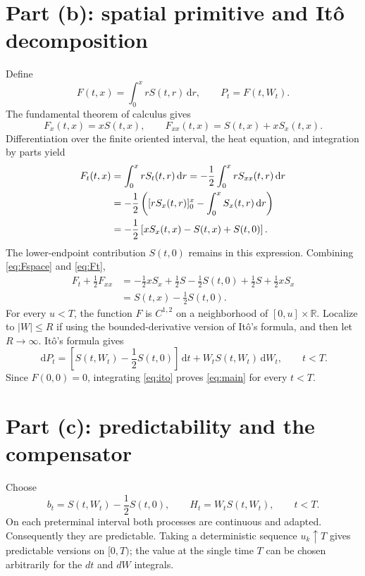 \documentclass[11pt,letterpaper]{article}
\newcommand{\R}{\mathbb R}
\newcommand{\dd}{\,\mathrm d}
\begin{document}
\section{Part (b): spatial primitive and It\^o decomposition}
Define
\begin{equation}
F(t,x)=\int_0^x rS(t,r)\dd r,\qquad P_t=F(t,W_t).
\end{equation}
The fundamental theorem of calculus gives
\begin{equation}\label{eq:Fspace}
F_x(t,x)=xS(t,x),\qquad F_{xx}(t,x)=S(t,x)+xS_x(t,x).
\end{equation}
Differentiation over the finite oriented interval, the heat equation, and integration by parts yield
\begin{align}
F_t(t,x)
&=\int_0^x rS_t(t,r)\dd r
=-\frac12\int_0^x rS_{xx}(t,r)\dd r\notag\\
&=-\frac12\left([rS_x(t,r)]_0^x-\int_0^xS_x(t,r)\dd r\right)\notag\\
&=-\frac12\left[xS_x(t,x)-S(t,x)+S(t,0)\right].\label{eq:Ft}
\end{align}
The lower-endpoint contribution $S(t,0)$ remains in this expression. Combining \eqref{eq:Fspace} and \eqref{eq:Ft},
\begin{equation}\label{eq:generator}
\begin{aligned}
F_t+\frac12F_{xx}
&=-\frac12xS_x+\frac12S-\frac12S(t,0)+\frac12S+\frac12xS_x\\
&=\boxed{S(t,x)-\frac12S(t,0)}.
\end{aligned}
\end{equation}
For every $u<T$, the function $F$ is $C^{1,2}$ on a neighborhood of $[0,u]\times\R$. Localize to $|W|\le R$ if using the bounded-derivative version of It\^o's formula, and then let $R\to\infty$. It\^o's formula gives
\begin{equation}\label{eq:ito}
\boxed{\dd P_t=\left[S(t,W_t)-\frac12S(t,0)\right]\dd t
+W_tS(t,W_t)\dd W_t,\qquad t<T.}
\end{equation}
Since $F(0,0)=0$, integrating \eqref{eq:ito} proves \eqref{eq:main} for every $t<T$.

\section{Part (c): predictability and the compensator}
Choose
\begin{equation}\label{eq:bH}
b_t=S(t,W_t)-\frac12S(t,0),\qquad H_t=W_tS(t,W_t),\qquad t<T.
\end{equation}
On each preterminal interval both processes are continuous and adapted. Consequently they are predictable. Taking a deterministic sequence $u_k\uparrow T$ gives predictable versions on $[0,T)$; the value at the single time $T$ can be chosen arbitrarily for the $dt$ and $dW$ integrals.
\end{document}

